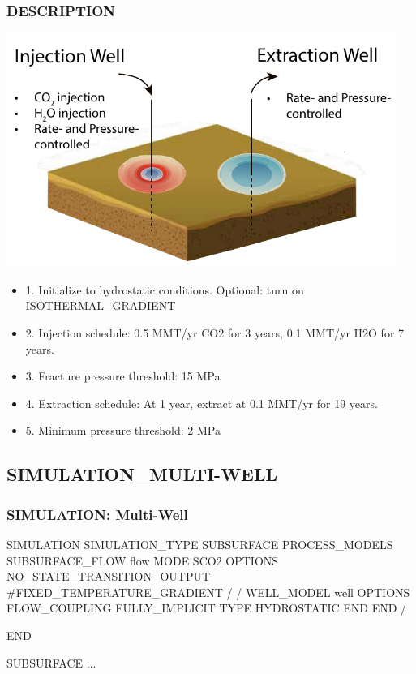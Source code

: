 \documentclass{beamer}
\newcommand\bluecomment[1]{{{\color{blue} #1}}}
\begin{document}
\begin{frame}\frametitle{DESCRIPTION}

\includegraphics[height=3in]{multi-well-fig.pdf}

\newpage
\begin{itemize}
  \item 1. Initialize to hydrostatic conditions. Optional: turn on \bluecomment{ISOTHERMAL\_GRADIENT}
  \item 2. Injection schedule: 0.5 MMT/yr CO2 for 3 years, 0.1 MMT/yr H2O for 7 years.
  \item 3. Fracture pressure threshold: 15 MPa
  \item 4. Extraction schedule: At 1 year, extract at 0.1 MMT/yr for 19 years.
  \item 5. Minimum pressure threshold: 2 MPa
\end{itemize}

\end{frame}

\subsection{SIMULATION\_MULTI-WELL}

\begin{frame}\frametitle{SIMULATION: Multi-Well}
\begin{semiverbatim}
SIMULATION
  SIMULATION_TYPE SUBSURFACE
  PROCESS_MODELS
    SUBSURFACE_FLOW flow
      MODE SCO2
      OPTIONS
        NO_STATE_TRANSITION_OUTPUT
        \bluecomment{#FIXED_TEMPERATURE_GRADIENT}
      /
    /
\newpage
    WELL_MODEL well
      OPTIONS
        FLOW_COUPLING FULLY_IMPLICIT
        TYPE HYDROSTATIC
      END
    END
  /

END

SUBSURFACE
...

\end{semiverbatim}

\end{frame}
\end{document}
